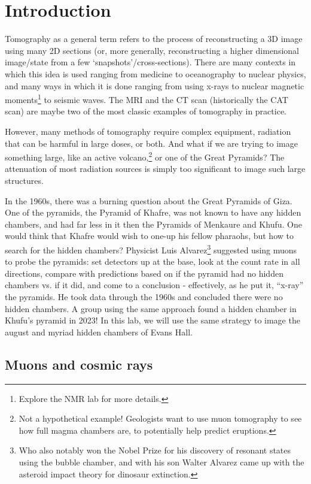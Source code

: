 \documentclass{../lab}
\begin{document}
\section{Introduction}

Tomography as a general term refers to the process of reconstructing a 3D image using many 2D sections (or, more generally, reconstructing a higher dimensional image/state from a few `snapshots'/cross-sections). There are many contexts in which this idea is used ranging from medicine to oceanography to nuclear physics, and many ways in which it is done ranging from using x-rays to nuclear magnetic moments\footnote{Explore the NMR lab for more details.} to seismic waves. The MRI and the CT scan (historically the CAT scan) are maybe two of the most classic examples of tomography in practice.

However, many methods of tomography require complex equipment, radiation that can be harmful in large doses, or both. And what if we are trying to image something large, like an active volcano,\footnote{Not a hypothetical example! Geologists want to use muon tomography to see how full magma chambers are, to potentially help predict eruptions.} or one of the Great Pyramids? The attenuation of most radiation sources is simply too significant to image such large structures.

In the 1960s, there was a burning question about the Great Pyramids of Giza. One of the pyramids, the Pyramid of Khafre, was not known to have any hidden chambers, and had far less in it then the Pyramids of Menkaure and Khufu. One would think that Khafre would wish to one-up his fellow pharaohs, but how to search for the hidden chambers? Physicist Luis Alvarez\footnote{Who also notably won the Nobel Prize for his discovery of resonant states using the bubble chamber, and with his son Walter Alvarez came up with the asteroid impact theory for dinosaur extinction.} suggested using muons to probe the pyramids: set detectors up at the base, look at the count rate in all directions, compare with predictions based on if the pyramid had no hidden chambers vs. if it did, and come to a conclusion - effectively, as he put it, ``x-ray'' the pyramids. He took data through the 1960s and concluded there were no hidden chambers. A group using the same approach found a hidden chamber in Khufu's pyramid in 2023! In this lab, we will use the same strategy to image the august and myriad hidden chambers of Evans Hall.

\subsection{Muons and cosmic rays}
\end{document}
